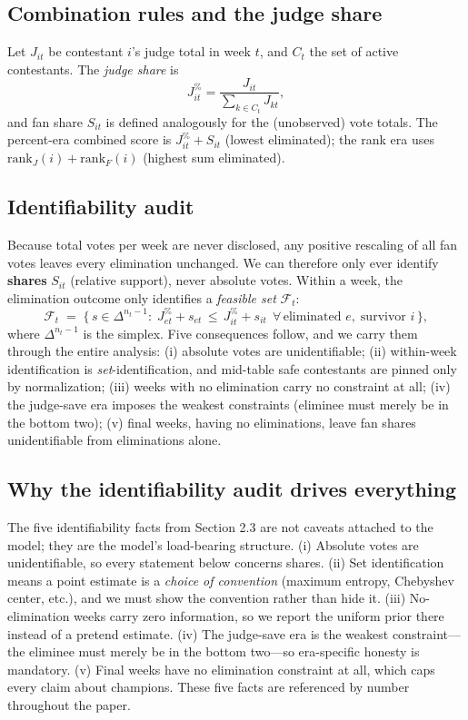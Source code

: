 \documentclass[12pt]{article}
\begin{document}
\subsection{Combination rules and the judge share}
Let $J_{it}$ be contestant $i$'s judge total in week $t$, and $C_t$ the set of active
contestants. The \emph{judge share} is
\begin{equation}
J^\%_{it} = \frac{J_{it}}{\sum_{k \in C_t} J_{kt}},
\end{equation}
and fan share $S_{it}$ is defined analogously for the (unobserved) vote totals.
The percent-era combined score is $J^\%_{it} + S_{it}$ (lowest eliminated); the rank
era uses $\mathrm{rank}_J(i) + \mathrm{rank}_F(i)$ (highest sum eliminated).

\subsection{Identifiability audit}
Because total votes per week are never disclosed, any positive rescaling of all fan
votes leaves every elimination unchanged. We can therefore only ever identify
\textbf{shares} $S_{it}$ (relative support), never absolute votes. Within a week,
the elimination outcome only identifies a \emph{feasible set} $\mathcal{F}_t$:
\begin{equation}
\mathcal{F}_t \;=\; \bigl\{\, s \in \Delta^{n_t-1} :\;
J^\%_{et} + s_{et} \,\le\, J^\%_{it} + s_{it} \ \ \forall\, \text{eliminated } e,\;
\text{survivor } i \,\bigr\},
\end{equation}
where $\Delta^{n_t-1}$ is the simplex. Five consequences follow, and we carry them
through the entire analysis:
(i) absolute votes are unidentifiable; (ii) within-week identification is
\emph{set}-identification, and mid-table safe contestants are pinned only by
normalization; (iii) weeks with no elimination carry no constraint at all;
(iv) the judge-save era imposes the weakest constraints (eliminee must merely be in
the bottom two); (v) final weeks, having no eliminations, leave fan shares
unidentifiable from eliminations alone.

\subsection*{Why the identifiability audit drives everything}
The five identifiability facts from Section 2.3 are not caveats attached to the
model; they are the model's load-bearing structure. (i) Absolute votes are
unidentifiable, so every statement below concerns shares. (ii) Set identification
means a point estimate is a \emph{choice of convention} (maximum entropy, Chebyshev
center, etc.), and we must show the convention rather than hide it. (iii) No-elimination
weeks carry zero information, so we report the uniform prior there instead of a
pretend estimate. (iv) The judge-save era is the weakest constraint---the eliminee
must merely be in the bottom two---so era-specific honesty is mandatory. (v) Final
weeks have no elimination constraint at all, which caps every claim about
champions. These five facts are referenced by number throughout the paper.
\end{document}

